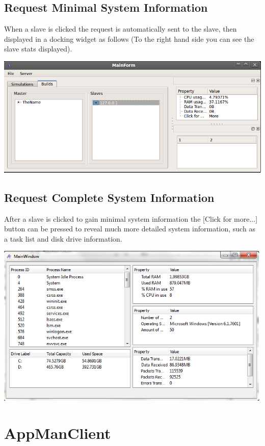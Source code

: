 \documentclass[a4paper,12pt,final]{article}
\begin{document}
\subsection{Request Minimal System Information}
When a slave is clicked the request is automatically sent to the slave, then displayed in a docking widget as follows (To the right hand side you can see the slave stats displayed).

\begin{center}
  	\includegraphics[scale=0.4]{SlaveStats.png}
 \end{center}
 
\subsection{Request Complete System Information}
After a slave is clicked to gain minimal system information the [Click for more...] button can be pressed to reveal much more detailed system information, such as a task list and disk drive information.

\begin{center}
  	\includegraphics[scale=0.5]{DetSlaveStats.png}
 \end{center}

\section{AppManClient}
\end{document}
